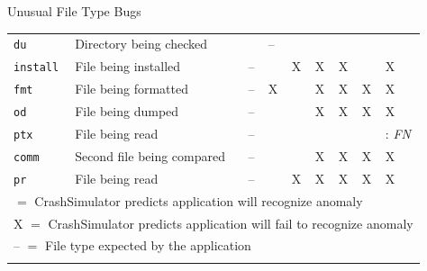 \documentclass[pdf]{beamer}
\newcommand{\tickmark}{\ding{51}}
\begin{document}
\begin{frame}{Unusual File Type Bugs}
\begin{table}[t]
\begin{tabular}{l  l  |  l  l  l  l  l  l  l}
        {\tt du}          & Directory being checked    & \tickmark              & --                      & \tickmark               & \tickmark              & \tickmark                  & \tickmark                 & \tickmark  \\
        {\tt install}     & File being installed       & --                     & \tickmark               & X                       & X                      & X                          & \tickmark                 & X          \\
        {\tt fmt}         & File being formatted       & --                     & X                       & \tickmark               & X                      & X                          & X                         & X          \\
        {\tt od}          & File being dumped          & --                     & \tickmark               & \tickmark               & X                      & X                          & X                         & X          \\
        {\tt ptx}         & File being read            & --                     & \tickmark               & \tickmark               & \tickmark              & \tickmark                  & \tickmark                 & \tickmark: \textit{FN} \\
        {\tt comm}        & Second file being compared & --                     & \tickmark               & \tickmark               & X                      & X                          & X                         & X          \\
        {\tt pr}          & File being read            & --                     & \tickmark               & X                       & X                      & X                          & X                         & X          \\
\hline
        \multicolumn{9}{l}{\scriptsize{\tickmark  $=$ CrashSimulator
        predicts application will recognize anomaly}}\\
        \multicolumn{9}{l}{\scriptsize{X $=$ CrashSimulator predicts
        application will fail to recognize anomaly}}\\
        \multicolumn{9}{l}{\scriptsize{-- $=$ File type expected by the
        application}}\\
    \bottomrule{}
    \end{tabular}
    \setlength{\belowcaptionskip}{-13pt}
\end{table}
\end{frame}
\end{document}
